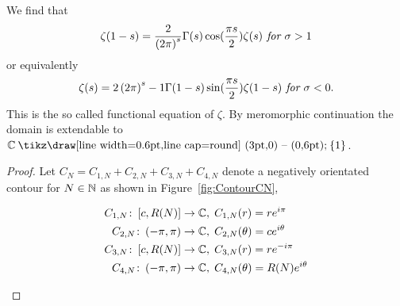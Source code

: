 \begin{theorem}
	We find that
\begin{equation}
	\zeta(1 - s) = \frac{2}{\left(2 \pi\right)^s} \Gamma(s) \cos(\frac{\pi s}{2}) \zeta(s) \textit{ for } \sigma > 1
\end{equation}
	or equivalently
\begin{equation}
	\zeta(s) = 2\left(2 \pi\right)^s-1 \Gamma(1 - s) \sin(\frac{\pi s}{2}) \zeta(1 - s) \textit{ for } \sigma < 0.
\end{equation}
	This is the so called functional equation of $\zeta$. By meromorphic continuation the domain is extendable to $\field{C} \mysetminus \fbr{1}$.
\end{theorem}
\begin{proof}
	Let $C_N = C_{1,N} + C_{2,N} + C_{3,N} + C_{4,N}$ denote a negatively orientated contour for $N \in \mathbb{N}$ as shown in Figure~\ref{fig:ContourCN},
\begin{figure}[!htb]
\begin{minipage}[c]{0.55\textwidth}
\centering
\begin{equation*}
\begin{aligned}
	C_{1,N} \colon \left[c, R(N)\right] &\to \mathbb{C}, \; C_{1,N}(r) = r e^{i \pi} \\
	C_{2,N} \colon \left(-\pi, \pi\right) &\to \mathbb{C}, \; C_{2,N}(\theta) = c e^{i \theta} \\
	C_{3,N} \colon \left[c, R(N)\right] &\to \mathbb{C}, \; C_{3,N}(r) = r e^{-i \pi} \\
	C_{4,N} \colon \left(-\pi, \pi\right) &\to \mathbb{C}, \; C_{4,N}(\theta) = R(N) e^{i \theta}
\end{aligned}
\end{equation*}
\end{minipage}
\begin{minipage}[c]{0.45\textwidth}
\raggedleft
{}
\end{minipage}
\end{figure}
\end{proof}
